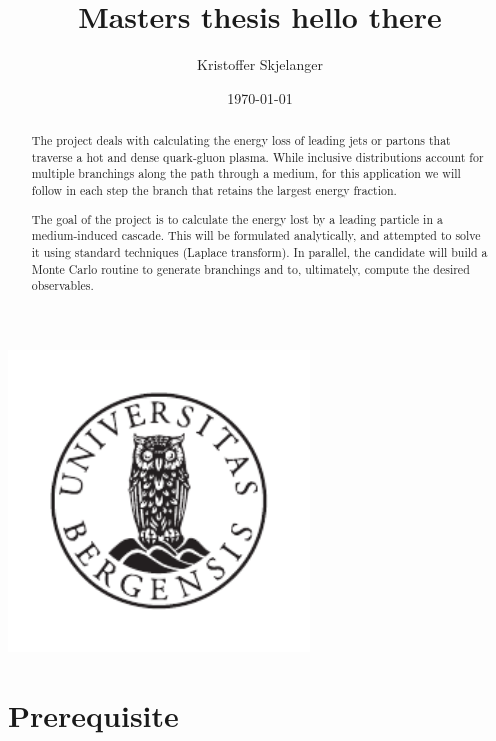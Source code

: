 \documentclass{article}
\title{Masters thesis \endgraf hello there}
\author{Kristoffer Skjelanger}
\date{\today}
\begin{document}
    \begin{titlepage}
    \maketitle
    \thispagestyle{empty}
    
    \begin{center}
        \includegraphics[width=8cm]{pictures/UiB-emblem_gray.pdf}
    \end{center}
    
    \begin{abstract}
        The project deals with calculating the energy loss of leading jets or partons that traverse a hot and dense quark-gluon plasma. While inclusive distributions account for multiple branchings along the path through a medium, for this application we will follow in each step the branch that retains the largest energy fraction.
        
        The goal of the project is to calculate the energy lost by a leading particle in a medium-induced cascade. This will be formulated analytically, and attempted to solve it using standard techniques (Laplace transform). In parallel, the candidate will build a Monte Carlo routine to generate branchings and to, ultimately, compute the desired observables.
    \end{abstract}
    
    \newpage
    \tableofcontents    
    \thispagestyle{empty}
    \end{titlepage}

    \newpage
    \part{Prerequisite}
        
\end{document}
